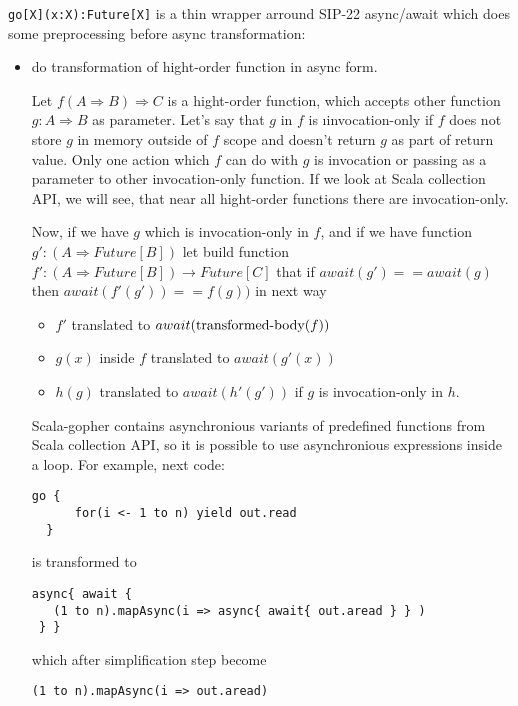 \documentclass[12pt]{article}
\newcommand{\To}{\Rightarrow}
\begin{document}
 \verb|go[X](x:X):Future[X]| is a thin wrapper arround  SIP-22 async/await which does some preprocessing before async transformation:
\begin{itemize}
 \item do transformation of hight-order function in async form.


  Let $f(A \To B)\To C$ is a hight-order function, which accepts other function 
   $g:A \To B$ as parameter. 
  Let's say that $g$ in $f$ is {\i invocation-only } if $f$ does not store $g$ in memory outside of $f$ scope and doesn't return $g$ as part of return value. Only one action which $f$ can do with $g$ is invocation or passing as a parameter to other invocation-only function. If we look at Scala collection API, we will see, that near all hight-order functions there are invocation-only.

  Now, if we have $g$ which is invocation-only in $f$, and if we have function $g' : (A \To Future[B])$ let build function $f':(A\To Future[B])\to Future[C]$ that if $await(g')==await(g)$ then $await(f'(g'))==f(g))$ in next way
  \begin{itemize}
    \item $f'$ translated to $await(\makebox{transformed-body}(f))$
    \item $g(x)$ inside $f$ translated to $await(g'(x))$
    \item $h(g)$ translated to $await(h'(g'))$ if $g$ is invocation-only in $h$.
  \end{itemize}

  Scala-gopher contains asynchronious variants of predefined functions from Scala collection API, so it is possible to use asynchronious expressions inside a loop. For example, next code:

\begin{Verbatim}[fontsize=\small]
  go { 
      for(i <- 1 to n) yield out.read
  }
\end{Verbatim}

  is transformed to

\begin{Verbatim}[fontsize=\small]
 async{ await {
   (1 to n).mapAsync(i => async{ await{ out.aread } } )
 } }
\end{Verbatim}

  which after simplification step become

\begin{Verbatim}[fontsize=\small]
   (1 to n).mapAsync(i => out.aread)
\end{Verbatim}


\end{itemize}
\end{document}
